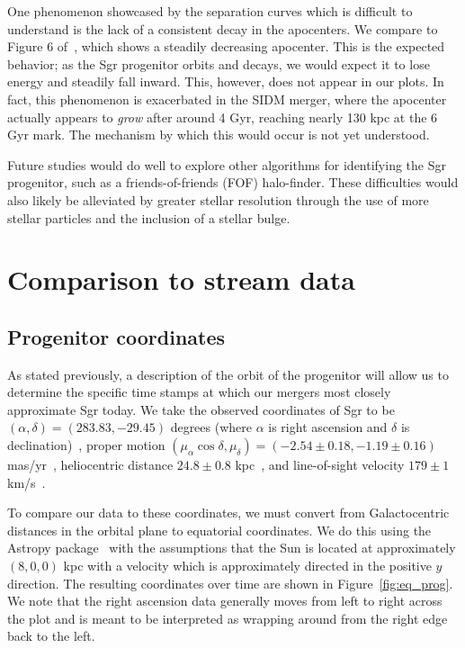 One phenomenon showcased by the separation curves which is difficult to
understand is the lack of a consistent decay in the apocenters.  We compare to
Figure 6 of~\cite{dierickx_predicted_2017}, which shows a steadily decreasing
apocenter.  This is the expected behavior; as the Sgr progenitor orbits and
decays, we would expect it to lose energy and steadily fall inward.  This,
however, does not appear in our plots.  In fact, this phenomenon is
exacerbated in the SIDM merger, where the apocenter actually appears to
\textit{grow} after around 4 Gyr, reaching nearly 130 kpc at the 6 Gyr mark.
The mechanism by which this would occur is not yet understood.

Future studies would do well to explore other algorithms for identifying the Sgr
progenitor, such as a friends-of-friends (FOF) halo-finder. These difficulties
would also likely be alleviated by greater stellar resolution through the use of
more stellar particles and the inclusion of a stellar bulge. 


\hypertarget{comparison-to-stream-data}{%
\section{Comparison to stream data}\label{comparison-to-stream-data}}

\hypertarget{progenitor-coordinates}{%
\subsection{Progenitor coordinates}\label{progenitor-coordinates}}

As stated previously, a description of the orbit of the progenitor will allow us
to determine the specific time stamps at which our mergers most closely
approximate Sgr today.  We take the observed coordinates of Sgr to be
$(\alpha, \delta) = (283.83, -29.45)$ degrees (where $\alpha$ is right
ascension and $\delta$ is declination)~\cite{nasa_nasaipac_nodate}, proper
motion $(\mu_\alpha \cos\delta, \mu_\delta) = (-2.54 \pm 0.18, -1.19 \pm
0.16)$ mas/yr~\cite{massari_hubble_2013}, heliocentric distance $24.8 \pm 0.8$
kpc~\cite{kunder_distance_2009}, and line-of-sight velocity $179 \pm 1$
km/s~\cite{dierickx_predicted_2017,bellazzini_nucleus_2008}.  

To compare our data to these coordinates, we must convert from Galactocentric
distances in the orbital plane to equatorial coordinates.  We do this using the
Astropy package~\cite{astropy_collaboration_astropy_2013,
astropy_collaboration_astropy_2018} with the assumptions that the Sun is
located at approximately $(8,0,0)$ kpc with a velocity which is approximately
directed in the positive $y$ direction.  The resulting coordinates over time
are shown in Figure~\ref{fig:eq_prog}.  We note that the right ascension data
generally moves from left to right across the plot and is meant to be
interpreted as wrapping around from the right edge back to the left.

